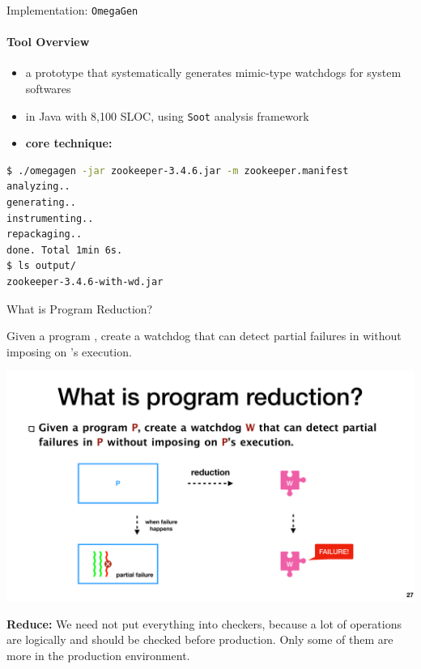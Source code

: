 \documentclass[aspectratio=169]{beamer}
\newcommand{\red}[1]{{\color{red}{#1}}}
\newcommand{\blue}[1]{{\color{blue}{#1}}}
\begin{document}
\begin{frame}[fragile]{Implementation: \texttt{OmegaGen}}
    \framesubtitle{Tool Overview}

    \begin{itemize}
        \item a prototype that systematically generates mimic-type watchdogs for system softwares
        \item in Java with 8,100 SLOC, using  \texttt{Soot} analysis framework
        \item \textbf{core technique:} \red{program reduction}

    \end{itemize}

    \begin{lstlisting}[language=sh]
$ ./omegagen -jar zookeeper-3.4.6.jar -m zookeeper.manifest
analyzing..
generating..
instrumenting..
repackaging..
done. Total 1min 6s.
$ ls output/
zookeeper-3.4.6-with-wd.jar
\end{lstlisting}

\end{frame}

\begin{frame}{What is Program Reduction?}
    \begin{definition}
        Given a program \red{$P$}, create a watchdog \blue{$W$} that can detect partial failures in \red{$P$} without imposing on \red{$P$}’s execution.
    \end{definition}

    \begin{center}
        \includegraphics[width=.6\textwidth]{fig/reduce}
    \end{center}

    \textbf{Reduce:} We need not put everything into checkers, because a lot of operations are logically \red{deterministic} and should be checked before production. Only some of them are more \red{vulnerable}
    in the production environment.
\end{frame}
\end{document}
